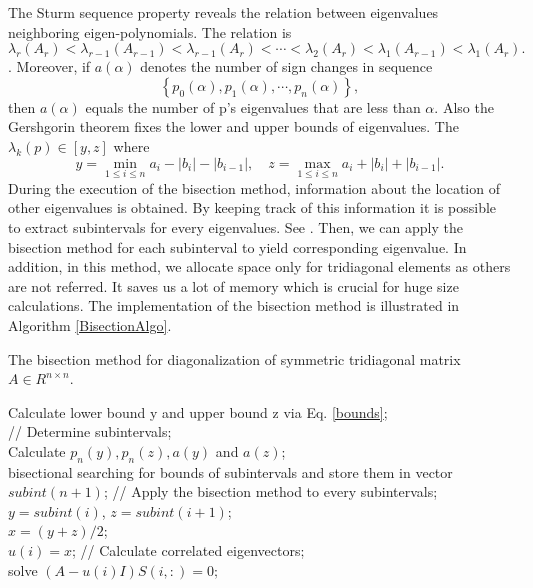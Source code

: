 The Sturm sequence property\cite{golub2012matrix} reveals the relation between eigenvalues neighboring eigen-polynomials. 
	The relation is 
\begin{equation}
	\lambda_r(A_r)<\lambda_{r-1}(A
	_{r-1})<\lambda_{r-1}(A
	_{r})<\cdots<\lambda_2(A
	_{r})<\lambda_{1}(A_
	{r-1})<\lambda_{1}(A_{r}).
\end{equation}.
Moreover, if $a(\alpha)$ denotes the number of sign changes in sequence
\[
	\left\{p_0(\alpha),p_1(\alpha),\cdots,p_n(\alpha)\right\},
\]
then $a(\alpha)$ equals the number of p's eigenvalues that are less than $\alpha$. 
Also the Gershgorin theorem fixes the lower and upper bounds of eigenvalues. 
The $\lambda_k(p)\in[y,z]$ where
\begin{equation}\label{bounds}
	y = \min_{1\le i \le n}a_i - |b_i| -|b_{i-1}|,\quad z = \max_{1\le i \le n}a_i + |b_i| + |b_{i-1}|.
\end{equation}
During the execution of the bisection method, information about the location of other eigenvalues is obtained.
By keeping track of this information it is possible to extract subintervals for every eigenvalues. 
See \cite{wilkinson1962calculation}.
Then, we can apply the bisection method for each subinterval to yield corresponding eigenvalue. 
In addition, in this method, we allocate space only for tridiagonal elements as others are not referred. 
It saves us a lot of memory which is crucial for huge size  calculations.
The implementation of the bisection method is illustrated in Algorithm \ref{BisectionAlgo}.
\begin{algorithm}[tb]
	\label{BisectionAlgo}
	\caption{The bisection method for diagonalization of symmetric tridiagonal matrix $A\in R^{n\times n}$. }
	Calculate lower bound y and upper bound z
	via Eq. \ref{bounds};\\
	// Determine subintervals;\\
	Calculate $p_n(y), p_n(z), a(y)$ and $a(z)$;\\
    {
		bisectional searching for bounds of subintervals and store them in vector $subint(n+1)$;
    }
    // Apply the bisection method to every subintervals;\\ 
	{
	$y = subint(i)$, $z = subint(i+1)$;\\
    {
		$x=(y+z)/2$;\\
    }
    $u(i) = x$;
    }
    // Calculate correlated eigenvectors;\\
    {
    solve $(A-u(i)I)S(i,:) = 0;$
    }
\end{algorithm}
